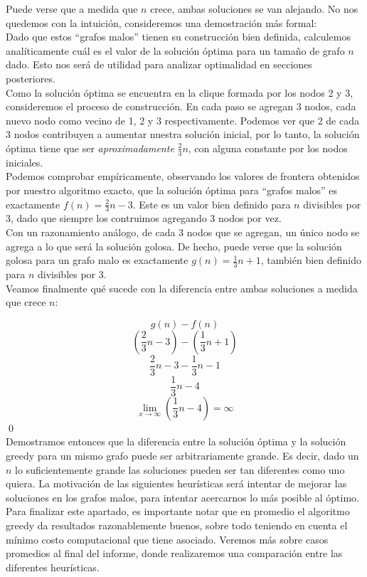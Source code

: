 Puede verse que a medida que $n$ crece, ambas soluciones se van alejando. No nos quedemos con la intuición, consideremos una demostración más formal: \\

Dado que estos ``grafos malos'' tienen su construcción bien definida, calculemos analíticamente cuál es el valor de la solución óptima para un tamaño de grafo $n$ dado. Esto nos será de utilidad para analizar optimalidad en secciones posteriores. \\

Como la solución óptima se encuentra en la clique formada por los nodos 2 y 3, consideremos el proceso de construcción. En cada paso se agregan 3 nodos, cada nuevo nodo como vecino de 1, 2 y 3 respectivamente. Podemos ver que 2 de cada 3 nodos contribuyen a aumentar nuestra solución inicial, por lo tanto, la solución óptima tiene que ser \textit{aproximadamente} $\frac{2}{3}n$, con alguna constante por los nodos iniciales. \\

Podemos comprobar empíricamente, observando los valores de frontera obtenidos por nuestro algoritmo exacto, que la solución óptima para ``grafos malos'' es exactamente $f(n) = \frac{2}{3}n - 3$. Este es un valor bien definido para $n$ divisibles por 3, dado que siempre los contruimos agregando 3 nodos por vez. \\

Con un razonamiento análogo, de cada 3 nodos que se agregan, un único nodo se agrega a lo que será la solución golosa. De hecho, puede verse que la solución golosa para un grafo malo es exactamente $g(n) = \frac{1}{3}n + 1$, también bien definido para $n$ divisibles por 3. \\

Veamos finalmente qué sucede con la diferencia entre ambas soluciones a medida que crece $n$:

$$g(n) - f(n)$$
$$(\frac{2}{3}n - 3) - (\frac{1}{3}n + 1)$$
$$\frac{2}{3}n - 3 - \frac{1}{3}n - 1$$
$$\frac{1}{3}n - 4$$
\[ \lim_{x \to \infty} (\frac{1}{3}n - 4) = \infty \] \qed \\

Demostramos entonces que la diferencia entre la solución óptima y la solución greedy para un mismo grafo puede ser arbitrariamente grande. Es decir, dado un $n$ lo suficientemente grande las soluciones pueden ser tan diferentes como uno quiera. La motivación de las siguientes heurísticas será intentar de mejorar las soluciones en los grafos malos, para intentar acercarnos lo más posible al óptimo. \\

Para finalizar este apartado, es importante notar que en promedio el algoritmo greedy da resultados razonablemente buenos, sobre todo teniendo en cuenta el mínimo costo computacional que tiene asociado. Veremos más sobre casos promedios al final del informe, donde realizaremos una comparación entre las diferentes heurísticas. \\
